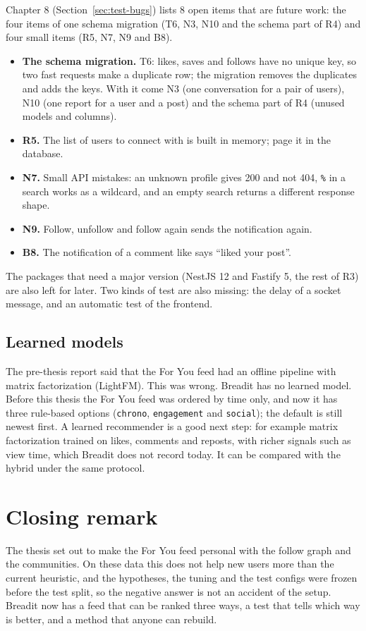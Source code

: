 Chapter 8 (Section~\ref{sec:test-bugs}) lists 8 open items that are future work: the four items of one schema migration (T6, N3, N10 and the schema part of R4) and four small items (R5, N7, N9 and B8).
\begin{itemize}
  \item \textbf{The schema migration.} T6: likes, saves and follows have no unique key, so two fast requests make a duplicate row; the migration removes the duplicates and adds the keys. With it come N3 (one conversation for a pair of users), N10 (one report for a user and a post) and the schema part of R4 (unused models and columns).
  \item \textbf{R5.} The list of users to connect with is built in memory; page it in the database.
  \item \textbf{N7.} Small API mistakes: an unknown profile gives 200 and not 404, \texttt{\%} in a search works as a wildcard, and an empty search returns a different response shape.
  \item \textbf{N9.} Follow, unfollow and follow again sends the notification again.
  \item \textbf{B8.} The notification of a comment like says ``liked your post''.
\end{itemize}
The packages that need a major version (NestJS 12 and Fastify 5, the rest of R3) are also left for later. Two kinds of test are also missing: the delay of a socket message, and an automatic test of the frontend.

\subsection{Learned models}

The pre-thesis report said that the For You feed had an offline pipeline with matrix factorization (LightFM). This was wrong. Breadit has no learned model. Before this thesis the For You feed was ordered by time only, and now it has three rule-based options (\texttt{chrono}, \texttt{engagement} and \texttt{social}); the default is still newest first. A learned recommender is a good next step: for example matrix factorization trained on likes, comments and reposts, with richer signals such as view time, which Breadit does not record today. It can be compared with the hybrid under the same protocol.

\section{Closing remark}
\label{sec:concl-close}

The thesis set out to make the For You feed personal with the follow graph and the communities. On these data this does not help new users more than the current heuristic, and the hypotheses, the tuning and the test configs were frozen before the test split, so the negative answer is not an accident of the setup. Breadit now has a feed that can be ranked three ways, a test that tells which way is better, and a method that anyone can rebuild.

